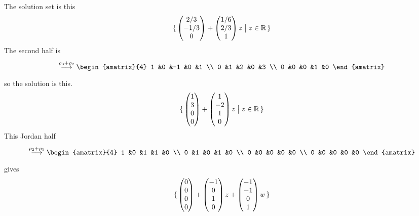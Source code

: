 \begin{exercises}
\begin{answer}
\begin{exparts}
\begin{equation*}
        \end{equation*}
        The solution set is this
        \begin{equation*}
          \mbox{$\{\,\begin{pmatrix} 2/3 \\ -1/3 \\ 0 \end{pmatrix}
               +\begin{pmatrix} 1/6 \\ 2/3 \\ 1 \end{pmatrix}z
              \bigm| z\in\mathbb{R}\,\}$}
        \end{equation*}
      \partsitem The second half is
        \begin{equation*}
          \grstep{\rho_3+\rho_2}
          \begin{amatrix}{4}
            1  &0  &-1  &0  &1 \\
            0  &1  &2   &0  &3 \\
            0  &0  &0   &1  &0
          \end{amatrix}
        \end{equation*}
        so the solution is this.
        \begin{equation*}
          \mbox{$\{\,\begin{pmatrix} 1 \\ 3 \\ 0 \\ 0 \end{pmatrix}
               +\begin{pmatrix} 1 \\ -2 \\ 1 \\ 0 \end{pmatrix}z
              \bigm| z\in\mathbb{R}\,\}$}
        \end{equation*}
      \partsitem This Jordan half
        \begin{equation*}
          \grstep{\rho_2+\rho_1}
          \begin{amatrix}{4}
            1  &0  &1   &1  &0 \\
            0  &1  &0   &1  &0 \\
            0  &0  &0   &0  &0 \\
            0  &0  &0   &0  &0
          \end{amatrix}
        \end{equation*}
        gives 
        \begin{equation*}
          \mbox{$\{\,\begin{pmatrix} 0 \\ 0 \\ 0 \\ 0 \end{pmatrix}
               +\begin{pmatrix} -1 \\ 0 \\ 1 \\ 0 \end{pmatrix}z
               +\begin{pmatrix} -1 \\ -1 \\ 0 \\ 1 \end{pmatrix}w
\,\}$}
\end{equation*}
\end{exparts}
\end{answer}
\end{exercises}
